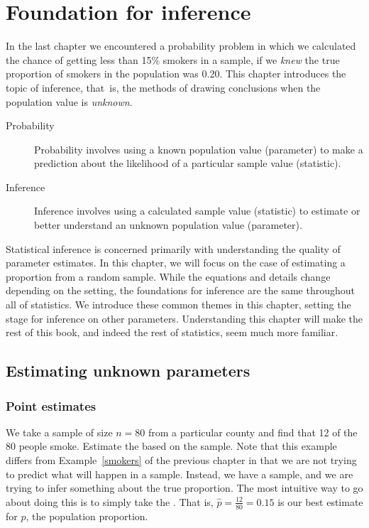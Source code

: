 \chapter{Foundation for inference}
\label{foundationsForInference}

In the last chapter we encountered a probability problem in which we calculated the chance of getting less than 15\% smokers in a sample, if we \emph{knew} the true proportion of smokers in the population was 0.20. This chapter introduces the topic of inference, that~is, the methods of drawing conclusions when the population value is \emph{unknown}.

\begin{termBox}{
\vspace{-5mm}
\begin{description}
\item[Probability] Probability involves using a known population value (parameter) to make a prediction about the likelihood of a particular sample value (statistic).
\item[Inference] Inference involves using a calculated sample value (statistic) to estimate or better understand an unknown population value (parameter).
\end{description}
}
\end{termBox}

Statistical inference is concerned primarily with understanding the quality of parameter estimates. In this chapter, we will focus on the case of estimating a proportion from a random sample. While the equations and details change depending on the setting, the foundations for inference are the same throughout all of statistics. We introduce these common themes in this chapter, setting the stage for inference on other parameters. Understanding this chapter will make the rest of this book, and indeed the rest of statistics, seem much more familiar.

\section{Estimating unknown parameters}
\subsection{Point estimates}
\label{pointEstimates}


\begin{example}{We take a sample of size $n=80$ from a particular county and find that 12 of the 80 people smoke. Estimate the  based on the sample. Note that this example differs from Example~\ref{smokers} of the previous chapter in that we are not trying to predict what will happen in a sample. Instead, we have a sample, and we are trying to infer something about the true proportion.} The most intuitive way to go about doing this is to simply take the . That is,
$\hat{p} = \frac{12}{80} = 0.15$ is our best estimate for $p$, the population proportion.
\end{example}

